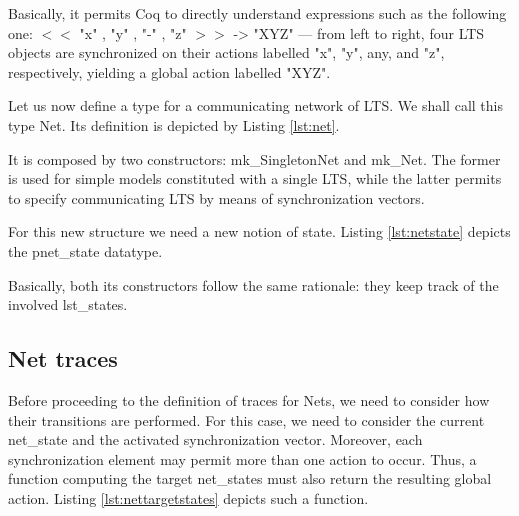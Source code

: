 		
                      	
    \noindent Basically, it permits Coq to directly understand expressions such 
    as the following one: \textsf{$<<$ "x" , "y" , "-" , "z" $>>$ -> "XYZ"} --- from left to right,
    four \textsf{LTS} objects are synchronized on their \textsf{actions} labelled \textsf{"x"}, \textsf{"y"}, any,
    and \textsf{"z"}, respectively, yielding a global \textsf{action} labelled \textsf{"XYZ"}.

	Let us now define a type for a communicating network of \ac{LTS}. We shall call this type \textsf{Net}.
	Its definition is depicted by Listing \ref{lst:net}.	

		

	\noindent It is composed by two constructors: \textsf{mk\_SingletonNet} and \textsf{mk\_Net}.
	The former is used for simple models constituted with a single \ac{LTS}, while the latter
	permits to specify communicating \ac{LTS} by means of synchronization vectors.
	
	For this new structure we need a new notion of state. Listing \ref{lst:netstate} depicts the \textsf{pnet\_state}
	datatype.

		

	\noindent Basically, both its constructors follow the same rationale: they keep track of the 
	involved \textsf{lst\_states}. 
	
	
  \subsection{Net traces}	
\label{sub:nettraces}		
	
	Before proceeding to the definition of traces for	\textsf{Net}s, we need to consider
	how their transitions are performed. For this case, we need to consider the current
	\textsf{net\_state} and the activated synchronization vector. Moreover, each synchronization
	element may permit more than one \textsf{action} to occur. Thus, a function
	computing the target \textsf{net\_state}s must also return the resulting global action.
	Listing \ref{lst:nettargetstates} depicts such a function.
		
